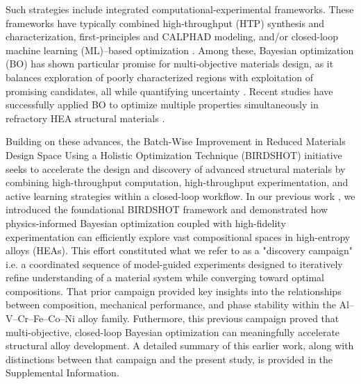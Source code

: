 
Such strategies include integrated computational-experimental frameworks. These frameworks have typically combined high‐throughput (HTP) synthesis and characterization, first‐principles and CALPHAD modeling, and/or closed-loop machine learning (ML)–based optimization \cite{Liu2022, Li2024, Li2017, Zhang2023}. Among these, Bayesian optimization (BO) has shown particular promise for multi‐objective materials design, as it balances exploration of poorly characterized regions with exploitation of promising candidates, all while quantifying uncertainty \cite{Snoek2012,Shahriari2016, Zhang2022, Mamun2025, Hanaoka2022, Arroyave2022}. Recent studies have successfully applied BO to optimize multiple properties simultaneously in refractory HEA structural materials \cite{Khatamsaz2022Multi-objectiveAlloys, Vela2023, Paramore2025}.

Building on these advances, the Batch-Wise Improvement in Reduced Materials Design Space Using a Holistic Optimization Technique (BIRDSHOT) initiative seeks to accelerate the design and discovery of advanced structural materials by combining high-throughput computation, high-throughput experimentation, and active learning strategies within a closed-loop workflow. In our previous work \cite{mulukutla2024illustrating,hastings2025acceleratedmultiobjectivealloydiscovery}, we introduced the foundational BIRDSHOT framework and demonstrated how physics-informed Bayesian optimization coupled with high-fidelity experimentation can efficiently explore vast compositional spaces in high-entropy alloys (HEAs). This effort constituted what we refer to as a "discovery campaign" i.e. a coordinated sequence of model-guided experiments designed to iteratively refine understanding of a material system while converging toward optimal compositions. That prior campaign provided key insights into the relationships between composition, mechanical performance, and phase stability within the Al–V–Cr–Fe–Co–Ni alloy family. Futhermore, this previous campaign proved that multi-objective, closed-loop Bayesian optimization can meaningfully accelerate structural alloy development. A detailed summary of this earlier work, along with distinctions between that campaign and the present study, is provided in the Supplemental Information.


